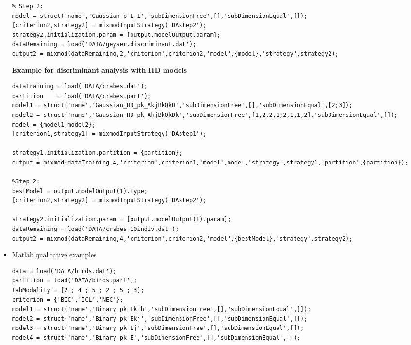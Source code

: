 \begin{itemize}
{\begin{verbatim}
% Step 2:
model = struct('name','Gaussian_p_L_I','subDimensionFree',[],'subDimensionEqual',[]);
[criterion2,strategy2] = mixmodInputStrategy('DAstep2');
strategy2.initialization.param = [output.modelOutput.param];
dataRemaining = load('DATA/geyser.discriminant.dat');
output2 = mixmod(dataRemaining,2,'criterion',criterion2,'model',{model},'strategy',strategy2);

 \end{verbatim}

{\normalsize \textbf { Example for discriminant analysis with HD models }}\\


 \begin{verbatim}
dataTraining = load('DATA/crabes.dat');
partition    = load('DATA/crabes.part');
model1 = struct('name','Gaussian_HD_pk_AkjBkQkD','subDimensionFree',[],'subDimensionEqual',[2;3]);
model2 = struct('name','Gaussian_HD_pk_AkjBkQkDk','subDimensionFree',[1,2,2,1;2,1,1,2],'subDimensionEqual',[]);
model = {model1,model2};
[criterion1,strategy1] = mixmodInputStrategy('DAstep1');

strategy1.initialization.partition = {partition};
output = mixmod(dataTraining,4,'criterion',criterion1,'model',model,'strategy',strategy1,'partition',{partition});

%Step 2:
bestModel = output.modelOutput(1).type;
[criterion2,strategy2] = mixmodInputStrategy('DAstep2');

strategy2.initialization.param = [output.modelOutput(1).param];
dataRemaining = load('DATA/crabes_10indiv.dat');
output2 = mixmod(dataRemaining,4,'criterion',criterion2,'model',{bestModel},'strategy',strategy2);

 \end{verbatim}}




\item Matlab qualitative examples\\

{\scriptsize
 \begin{verbatim}
data = load('DATA/birds.dat');
partition = load('DATA/birds.part');
tabModality = [2 ; 4 ; 5 ; 2 ; 5 ; 3];
criterion = {'BIC','ICL','NEC'};
model1 = struct('name','Binary_pk_Ekjh','subDimensionFree',[],'subDimensionEqual',[]);
model2 = struct('name','Binary_pk_Ekj','subDimensionFree',[],'subDimensionEqual',[]);
model3 = struct('name','Binary_pk_Ej','subDimensionFree',[],'subDimensionEqual',[]);
model4 = struct('name','Binary_pk_E','subDimensionFree',[],'subDimensionEqual',[]);


\end{verbatim}}
\end{itemize}
